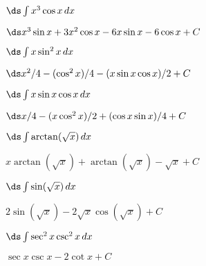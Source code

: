 \begin{exercises}
\begin{exercise} $\ds\int x^3\cos x\,dx$
\begin{answer} $\ds x^3\sin x+3x^2\cos x-6x\sin x-6\cos x+C$
\end{answer}\end{exercise}

\begin{exercise} $\ds\int x\sin^2 x\,dx$
\begin{answer} $\ds x^2/4-(\cos^2 x)/4-(x\sin x\cos x)/2+C$
\end{answer}\end{exercise}

\begin{exercise} $\ds\int x\sin x\cos x\,dx$
\begin{answer} $\ds x/4-(x\cos^2 x)/2+(\cos x\sin x)/4+C$
\end{answer}\end{exercise}

\begin{exercise} $\ds\int \arctan(\sqrt x)\,dx$
\begin{answer} $x\arctan(\sqrt x)+\arctan(\sqrt x)-\sqrt{x}+C$
\end{answer}\end{exercise}

\begin{exercise} $\ds\int \sin(\sqrt x)\,dx$
\begin{answer} $2\sin(\sqrt x)-2\sqrt x\cos(\sqrt x)+C$
\end{answer}\end{exercise}

\begin{exercise} $\ds\int\sec^2 x\csc^2 x\,dx$
\begin{answer} $\sec x\csc x-2\cot x+C$
\end{answer}\end{exercise}

\endtwocol

\end{exercises}

